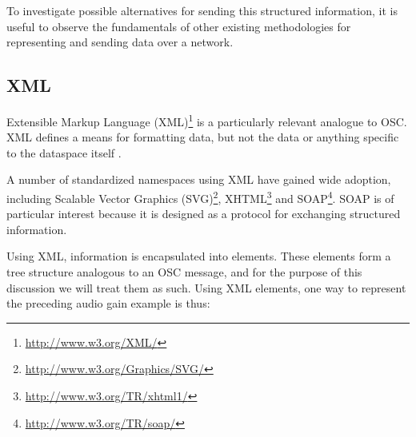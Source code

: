 \documentclass{NIME-alternate}
\begin{document}
\begin{Abstract}
To investigate possible alternatives for sending this structured information, it is useful to observe the fundamentals of other existing methodologies for representing and sending data over a network.

%
%
%



\subsection{XML}
\label{sub:xml}

Extensible Markup Language (XML)\footnote{\url{http://www.w3.org/XML/}} is a particularly relevant analogue to OSC.  XML defines a means for formatting data, but not the data or anything specific to the dataspace itself \cite{xml:2006}. 

A number of standardized namespaces using XML have gained wide adoption, including Scalable Vector Graphics (SVG)\footnote{\url{http://www.w3.org/Graphics/SVG/}}, XHTML\footnote{\url{http://www.w3.org/TR/xhtml1/}} and SOAP\footnote{\url{http://www.w3.org/TR/soap/}}.  SOAP is of particular interest because it is designed as a protocol for exchanging structured information.

Using XML, information is encapsulated into elements.  These elements form a tree structure analogous to an OSC message, and for the purpose of this discussion we will treat them as such.  Using XML elements, one way to represent the preceding audio gain example is thus:


\end{Abstract}
\end{document}
